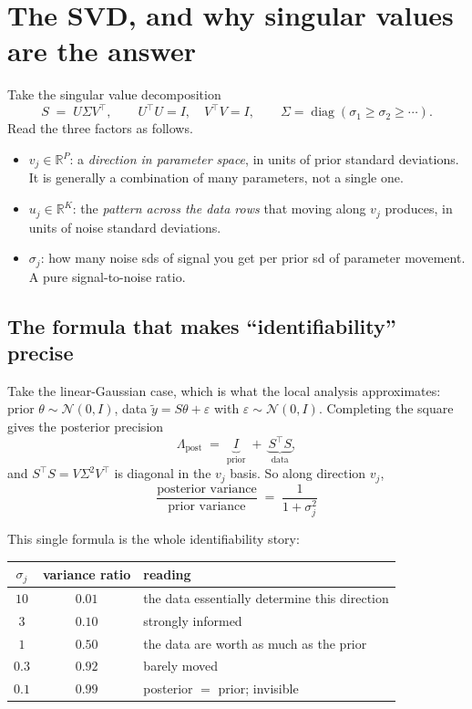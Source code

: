 \documentclass[11pt]{article}
\newcommand{\R}{\mathbb{R}}
\newcommand{\muraw}{\theta}
\begin{document}
\section{The SVD, and why singular values are the answer}

Take the singular value decomposition
\begin{equation}
  S \;=\; U \Sigma V^{\top},
  \qquad U^{\top}U = I, \quad V^{\top}V = I,
  \qquad \Sigma = \operatorname{diag}(\sigma_1 \ge \sigma_2 \ge \cdots).
  \label{eq:svd}
\end{equation}
Read the three factors as follows.

\begin{itemize}
  \item $v_j \in \R^{P}$: a \emph{direction in parameter space}, in units of
        prior standard deviations. It is generally a combination of many
        parameters, not a single one.
  \item $u_j \in \R^{K}$: the \emph{pattern across the data rows} that moving
        along $v_j$ produces, in units of noise standard deviations.
  \item $\sigma_j$: how many noise sds of signal you get per prior sd of
        parameter movement. A pure signal-to-noise ratio.
\end{itemize}

\subsection{The formula that makes ``identifiability'' precise}

Take the linear-Gaussian case, which is what the local analysis approximates:
prior $\muraw \sim \mathcal N(0, I)$, data $\tilde y = S\muraw + \varepsilon$
with $\varepsilon \sim \mathcal N(0, I)$. Completing the square gives the
posterior precision
\[
  \Lambda_{\text{post}} \;=\; \underbrace{I}_{\text{prior}}
    \;+\; \underbrace{S^{\top}S}_{\text{data}} ,
\]
and $S^{\top}S = V \Sigma^2 V^{\top}$ is diagonal in the $v_j$ basis. So along
direction $v_j$,
\begin{equation}
  \boxed{\;
    \frac{\text{posterior variance}}{\text{prior variance}}
    \;=\; \frac{1}{1+\sigma_j^{2}} \; }
  \label{eq:shrink}
\end{equation}

This single formula is the whole identifiability story:

\begin{center}
\begin{tabular}{ccl}
  \toprule
  $\sigma_j$ & variance ratio & reading \\
  \midrule
  $10$   & $0.01$ & the data essentially determine this direction \\
  $3$    & $0.10$ & strongly informed \\
  $1$    & $0.50$ & the data are worth as much as the prior \\
  $0.3$  & $0.92$ & barely moved \\
  $0.1$  & $0.99$ & posterior $=$ prior; invisible \\
  \bottomrule
\end{tabular}
\end{center}
\end{document}
